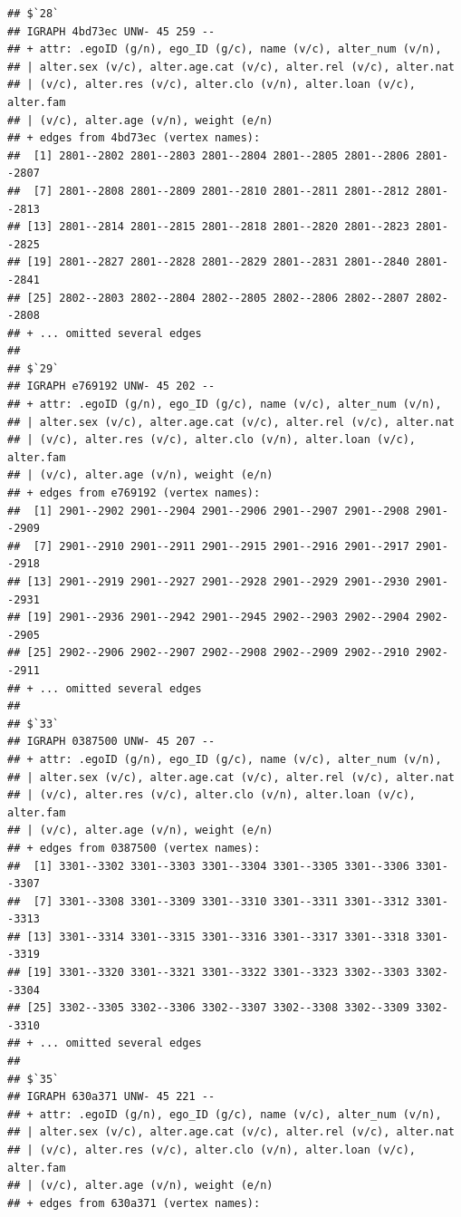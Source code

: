 \documentclass[
]{book}
\begin{document}
\begin{verbatim}
## $`28`
## IGRAPH 4bd73ec UNW- 45 259 -- 
## + attr: .egoID (g/n), ego_ID (g/c), name (v/c), alter_num (v/n),
## | alter.sex (v/c), alter.age.cat (v/c), alter.rel (v/c), alter.nat
## | (v/c), alter.res (v/c), alter.clo (v/n), alter.loan (v/c), alter.fam
## | (v/c), alter.age (v/n), weight (e/n)
## + edges from 4bd73ec (vertex names):
##  [1] 2801--2802 2801--2803 2801--2804 2801--2805 2801--2806 2801--2807
##  [7] 2801--2808 2801--2809 2801--2810 2801--2811 2801--2812 2801--2813
## [13] 2801--2814 2801--2815 2801--2818 2801--2820 2801--2823 2801--2825
## [19] 2801--2827 2801--2828 2801--2829 2801--2831 2801--2840 2801--2841
## [25] 2802--2803 2802--2804 2802--2805 2802--2806 2802--2807 2802--2808
## + ... omitted several edges
## 
## $`29`
## IGRAPH e769192 UNW- 45 202 -- 
## + attr: .egoID (g/n), ego_ID (g/c), name (v/c), alter_num (v/n),
## | alter.sex (v/c), alter.age.cat (v/c), alter.rel (v/c), alter.nat
## | (v/c), alter.res (v/c), alter.clo (v/n), alter.loan (v/c), alter.fam
## | (v/c), alter.age (v/n), weight (e/n)
## + edges from e769192 (vertex names):
##  [1] 2901--2902 2901--2904 2901--2906 2901--2907 2901--2908 2901--2909
##  [7] 2901--2910 2901--2911 2901--2915 2901--2916 2901--2917 2901--2918
## [13] 2901--2919 2901--2927 2901--2928 2901--2929 2901--2930 2901--2931
## [19] 2901--2936 2901--2942 2901--2945 2902--2903 2902--2904 2902--2905
## [25] 2902--2906 2902--2907 2902--2908 2902--2909 2902--2910 2902--2911
## + ... omitted several edges
## 
## $`33`
## IGRAPH 0387500 UNW- 45 207 -- 
## + attr: .egoID (g/n), ego_ID (g/c), name (v/c), alter_num (v/n),
## | alter.sex (v/c), alter.age.cat (v/c), alter.rel (v/c), alter.nat
## | (v/c), alter.res (v/c), alter.clo (v/n), alter.loan (v/c), alter.fam
## | (v/c), alter.age (v/n), weight (e/n)
## + edges from 0387500 (vertex names):
##  [1] 3301--3302 3301--3303 3301--3304 3301--3305 3301--3306 3301--3307
##  [7] 3301--3308 3301--3309 3301--3310 3301--3311 3301--3312 3301--3313
## [13] 3301--3314 3301--3315 3301--3316 3301--3317 3301--3318 3301--3319
## [19] 3301--3320 3301--3321 3301--3322 3301--3323 3302--3303 3302--3304
## [25] 3302--3305 3302--3306 3302--3307 3302--3308 3302--3309 3302--3310
## + ... omitted several edges
## 
## $`35`
## IGRAPH 630a371 UNW- 45 221 -- 
## + attr: .egoID (g/n), ego_ID (g/c), name (v/c), alter_num (v/n),
## | alter.sex (v/c), alter.age.cat (v/c), alter.rel (v/c), alter.nat
## | (v/c), alter.res (v/c), alter.clo (v/n), alter.loan (v/c), alter.fam
## | (v/c), alter.age (v/n), weight (e/n)
## + edges from 630a371 (vertex names):

\end{verbatim}
\end{document}
